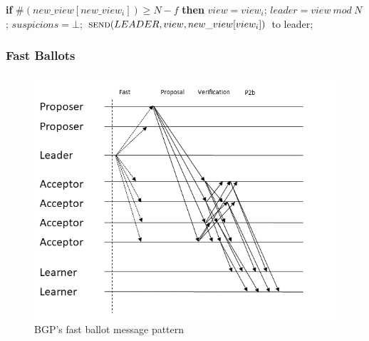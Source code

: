 \begin{algorithm}
\begin{algorithmic}[1]
		\State
		\State\hspace{\algorithmicindent} \textbf{if} $\#(new\_view[new\_view_i]) \geq N-f$ \textbf{then}
		\State\hspace{\algorithmicindent}\hspace{\algorithmicindent} $view = view_i$;
		\State\hspace{\algorithmicindent}\hspace{\algorithmicindent} $leader = view\ mod\ N$;
		\State\hspace{\algorithmicindent}\hspace{\algorithmicindent} $suspicions = \bot$;
		\State\hspace{\algorithmicindent}\hspace{\algorithmicindent} $\Call{send}{LEADER, view, new\_view[view_i]}$ to leader;
	\end{algorithmic}
\end{algorithm}

\subsubsection{Fast Ballots} 

\begin{figure}
	\centering
	\includegraphics[width=\textwidth*2/3]{Figures/bgp_fast}
	\caption{BGP's fast ballot message pattern}
	\label{bgp_fast}
\end{figure}

